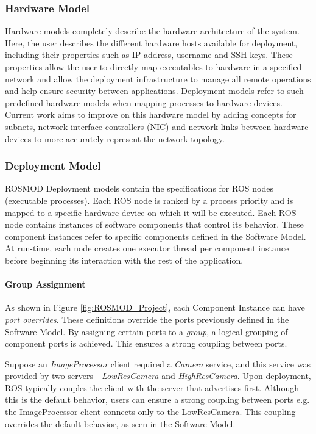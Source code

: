 \subsubsection{Hardware Model}

Hardware models completely describe the hardware architecture of the system. Here, the user describes the different hardware hosts available for deployment, including their properties such as IP address, username and SSH keys.  These properties allow the user to directly map executables to hardware in a specified network and allow the deployment infrastructure to manage all remote operations and help ensure security between applications.  Deployment models refer to such predefined hardware models when mapping processes to hardware devices. Current work aims to improve on this hardware model by adding concepts for subnets, network interface controllers (NIC) and network links between hardware devices to more accurately represent the network topology.

\subsubsection{Deployment Model}

ROSMOD Deployment models contain the specifications for ROS nodes (executable processes). Each ROS node is ranked by a process priority and is mapped to a specific hardware device on which it will be executed. Each ROS node contains instances of software components that control its behavior. These component instances refer to specific components defined in the Software Model. At run-time, each node creates one executor thread per component instance before  beginning its interaction with the rest of the application. 

\paragraph{Group Assignment}
As shown in Figure \ref{fig:ROSMOD_Project}, each Component Instance can have \emph{port overrides}. These definitions override the ports previously defined in the Software Model. By assigning certain ports to a \emph{group}, a logical grouping of component ports is achieved. This ensures a strong coupling between ports. 

Suppose an \emph{ImageProcessor} client required a \emph{Camera} service, and this service was provided by two servers - \emph{LowResCamera} and \emph{HighResCamera}. Upon deployment, ROS typically couples the client with the server that advertises first. Although this is the default behavior, users can ensure a strong coupling between ports e.g. the ImageProcessor client connects only to the LowResCamera. This coupling overrides the default behavior, as seen in the Software Model.

